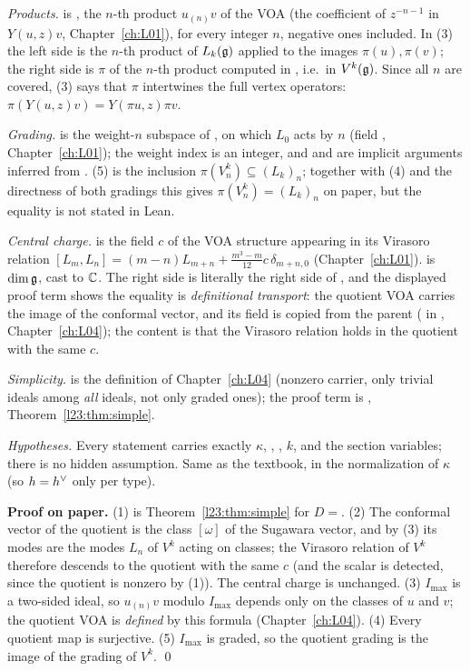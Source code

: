 \begin{dictionary}
\emph{Products.}  is , the $n$-th product $u_{(n)}v$ of the VOA  (the coefficient of
$z^{-n-1}$ in $Y(u,z)v$, Chapter~\ref{ch:L01}), for every integer $n$, negative ones included. In (3) the left side is the $n$-th product of $L_k(\mathfrak g)$
applied to the images $\pi(u),\pi(v)$; the right side is $\pi$ of the $n$-th product computed in , i.e.\ in
$V^k(\mathfrak g)$. Since all $n$ are covered, (3) says that
$\pi$ intertwines the full vertex operators: $\pi(Y(u,z)v)=Y(\pi u,z)\pi v$.

\emph{Grading.}  is the weight-$n$ subspace of , on which $L_0$ acts by $n$ (field , Chapter~\ref{ch:L01}); the weight
index is an integer, and  and  are implicit arguments inferred from . (5) is the inclusion
$\pi(V^k_n)\subseteq (L_k)_n$; together with (4) and the directness of both gradings this gives $\pi(V^k_n)=(L_k)_n$ on paper, but
the equality is not stated in Lean.

\emph{Central charge.}  is the field $c$ of the VOA structure appearing in its Virasoro relation
$[L_m,L_n]=(m-n)L_{m+n}+\frac{m^3-m}{12}c\,\delta_{m+n,0}$ (Chapter~\ref{ch:L01}).
 is $\dim\mathfrak g$, cast to ${\mathbb{C}}$. The right side is literally the right side of
, and the displayed proof term shows the equality is \emph{definitional transport}: the quotient
VOA carries the image of the conformal vector, and its  field is copied from the parent
( in , Chapter~\ref{ch:L04}); the content is that the Virasoro relation
holds in the quotient with the same $c$.

\emph{Simplicity.}  is the definition of Chapter~\ref{ch:L04} (nonzero carrier, only trivial ideals among \emph{all}
ideals, not only graded ones); the proof term is , Theorem~\ref{l23:thm:simple}.

\emph{Hypotheses.} Every statement carries exactly $\kappa$, , , $k$,  and the section variables;
there is no hidden assumption. Same as the textbook, in the normalization of $\kappa$ (so $h=h^\vee$ only per type).
\end{dictionary}

\textbf{Proof on paper.} (1) is Theorem~\ref{l23:thm:simple} for $D=$. (2) The conformal vector of the quotient is
the class $[\omega]$ of the Sugawara vector, and by (3) its modes are the modes $L_n$ of $V^k$ acting on classes; the Virasoro relation
of $V^k$ therefore descends to the quotient with the same $c$ (and the scalar is detected, since the quotient is nonzero by (1)). The
central charge is unchanged. (3) $I_{\max}$ is a two-sided
ideal, so $u_{(n)}v$ modulo $I_{\max}$ depends only on the classes of $u$ and $v$; the quotient VOA is \emph{defined} by this formula
(Chapter~\ref{ch:L04}). (4) Every quotient map is surjective. (5) $I_{\max}$ is graded, so the quotient grading is the image of the
grading of $V^k$. \qed

